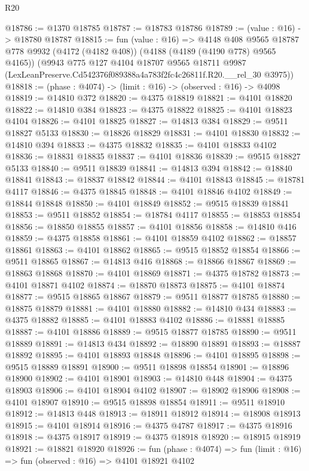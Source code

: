 \begin{lexlean}{R20}
\begin{coremodule}
@18786 := @1370 @18785
@18787 := @18783 @18786
@18789 := (value : @16) -> @18780 @18787
@18815 := fun (value : @16) =>
  @4148
    @408
    @9565
    @18787
    @778
    @9932
    (@4172 (@4182 @408))
    (@4188 (@4189 (@4190 @778) @9565 @4165))
    (@9943
      @775
      @127
      @4104
      @18707
      @9565
      @18711
      @9987
      (LexLeanPreserve.Cd542376f089388a4a783f2fc4c26811f.R20.__rel_30 @3975))
@18818 := (phase : @4074) -> (limit : @16) -> (observed : @16) -> @4098
@18819 := @14810 @372
@18820 := @4375 @18819
@18821 := @4101 @18820
@18822 := @14810 @384
@18823 := @4375 @18822
@18825 := @4101 @18823 @4104
@18826 := @4101 @18825
@18827 := @14813 @384
@18829 := @9511 @18827 @5133
@18830 := @18826 @18829
@18831 := @4101 @18830
@18832 := @14810 @394
@18833 := @4375 @18832
@18835 := @4101 @18833 @4102
@18836 := @18831 @18835
@18837 := @4101 @18836
@18839 := @9515 @18827 @5133
@18840 := @9511 @18839
@18841 := @14813 @394
@18842 := @18840 @18841
@18843 := @18837 @18842
@18844 := @4101 @18843
@18845 := @18781 @4117
@18846 := @4375 @18845
@18848 := @4101 @18846 @4102
@18849 := @18844 @18848
@18850 := @4101 @18849
@18852 := @9515 @18839 @18841
@18853 := @9511 @18852
@18854 := @18784 @4117
@18855 := @18853 @18854
@18856 := @18850 @18855
@18857 := @4101 @18856
@18858 := @14810 @416
@18859 := @4375 @18858
@18861 := @4101 @18859 @4102
@18862 := @18857 @18861
@18863 := @4101 @18862
@18865 := @9515 @18852 @18854
@18866 := @9511 @18865
@18867 := @14813 @416
@18868 := @18866 @18867
@18869 := @18863 @18868
@18870 := @4101 @18869
@18871 := @4375 @18782
@18873 := @4101 @18871 @4102
@18874 := @18870 @18873
@18875 := @4101 @18874
@18877 := @9515 @18865 @18867
@18879 := @9511 @18877 @18785
@18880 := @18875 @18879
@18881 := @4101 @18880
@18882 := @14810 @434
@18883 := @4375 @18882
@18885 := @4101 @18883 @4102
@18886 := @18881 @18885
@18887 := @4101 @18886
@18889 := @9515 @18877 @18785
@18890 := @9511 @18889
@18891 := @14813 @434
@18892 := @18890 @18891
@18893 := @18887 @18892
@18895 := @4101 @18893 @18848
@18896 := @4101 @18895
@18898 := @9515 @18889 @18891
@18900 := @9511 @18898 @18854
@18901 := @18896 @18900
@18902 := @4101 @18901
@18903 := @14810 @448
@18904 := @4375 @18903
@18906 := @4101 @18904 @4102
@18907 := @18902 @18906
@18908 := @4101 @18907
@18910 := @9515 @18898 @18854
@18911 := @9511 @18910
@18912 := @14813 @448
@18913 := @18911 @18912
@18914 := @18908 @18913
@18915 := @4101 @18914
@18916 := @4375 @4787
@18917 := @4375 @18916
@18918 := @4375 @18917
@18919 := @4375 @18918
@18920 := @18915 @18919
@18921 := @18821 @18920
@18926 := fun (phase : @4074) => fun (limit : @16) => fun (observed : @16) => @4101 @18921 @4102

\end{coremodule}
\end{lexlean}

